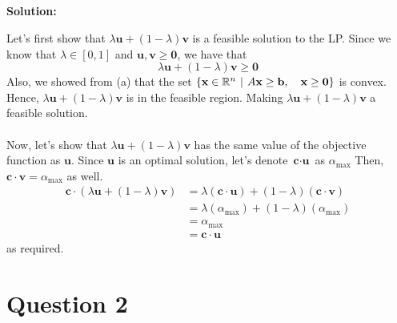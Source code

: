 \documentclass[11pt]{article}
\newenvironment{solution}
  {\par\noindent\textbf{Solution:}\par}
  {\par}
\begin{document}
\subsection{}
\begin{solution}
  Let's first show that $\lambda\textbf{u} + (1-\lambda)\textbf{v}$ is a feasible solution to the LP. Since we know that $\lambda \in [0,1]$ and $\textbf{u},\textbf{v} \ge \textbf{0}$, we have that 
  \[
    \lambda \textbf{u} + (1-\lambda)\textbf{v} \ge \textbf{0}
  \]
  Also, we showed from (a) that the set $\left\{ \textbf{x}\in \mathbb{R}^n \hspace{.05in} \vert \hspace{.05in} A\textbf{x} \ge \textbf{b}, \quad \textbf{x} \ge \textbf{0} \right\}$ is convex. Hence,
    $\lambda \textbf{u} + (1-\lambda)\textbf{v}$ is in the feasible region. Making $\lambda\textbf{u} + (1-\lambda)\textbf{v}$ a feasible solution. \\  \\
    Now, let's show that $\lambda \textbf{u} + (1-\lambda)\textbf{v}$ has the same value of the objective function as $\textbf{u}$. Since $\textbf{u}$ is an optimal solution, let's denote $\textbf{c} \cdot \textbf{u}$ as $\alpha_\text{max}$ 
    Then, $\textbf{c} \cdot \textbf{v} = \alpha_\text{max}$ as well.
    \[
      \begin{aligned}
        \textbf{c} \cdot (\lambda \textbf{u} + (1-\lambda)\textbf{v}) &= \lambda (\textbf{c} \cdot \textbf{u}) + (1-\lambda)(\textbf{c} \cdot \textbf{v}) \\ 
                                                                      &= \lambda (\alpha_{\text{max}}) + (1-\lambda)(\alpha_\text{max}) \\ 
                                                                      &= \alpha_\text{max} \\ 
                                                                      &= \textbf{c} \cdot \textbf{u}
      \end{aligned}
    \]
    as required.
  \end{solution}

\section*{Question 2}
\end{document}
